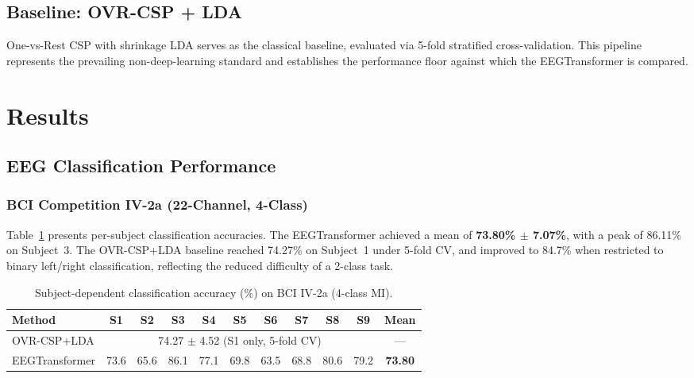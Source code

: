 \documentclass[12pt, a4paper]{article}
\begin{document}
\subsection{Baseline: OVR-CSP + LDA}

One-vs-Rest CSP with shrinkage LDA serves as the classical baseline, evaluated via 5-fold stratified cross-validation. This pipeline represents the prevailing non-deep-learning standard and establishes the performance floor against which the EEGTransformer is compared.

\section{Results}

\subsection{EEG Classification Performance}

\subsubsection{BCI Competition IV-2a (22-Channel, 4-Class)}

Table~\ref{tab:iv2a_results} presents per-subject classification accuracies. The EEGTransformer achieved a mean of \textbf{73.80\% $\pm$ 7.07\%}, with a peak of 86.11\% on Subject~3. The OVR-CSP+LDA baseline reached 74.27\% on Subject~1 under 5-fold CV, and improved to 84.7\% when restricted to binary left/right classification, reflecting the reduced difficulty of a 2-class task.

\begin{table}[htbp]
\centering
\caption{Subject-dependent classification accuracy (\%) on BCI IV-2a (4-class MI).}
\label{tab:iv2a_results}
\begin{tabular}{lcccccccccc}
\toprule
\textbf{Method} & \textbf{S1} & \textbf{S2} & \textbf{S3} & \textbf{S4} & \textbf{S5} & \textbf{S6} & \textbf{S7} & \textbf{S8} & \textbf{S9} & \textbf{Mean} \\
\midrule
OVR-CSP+LDA & \multicolumn{9}{c}{74.27 $\pm$ 4.52 (S1 only, 5-fold CV)} & --- \\
EEGTransformer & 73.6 & 65.6 & 86.1 & 77.1 & 69.8 & 63.5 & 68.8 & 80.6 & 79.2 & \textbf{73.80} \\
\bottomrule
\end{tabular}
\end{table}
\end{document}
